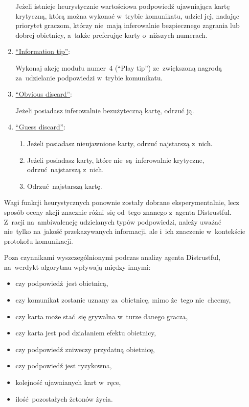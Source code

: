\documentclass[declaration,shortabstract,inz]{iithesis}
\begin{document}
\begin{enumerate}
	Jeżeli istnieje heurystycznie wartościowa podpowiedź ujawniająca kartę krytyczną, którą można wykonać w~trybie komunikatu, udziel jej, nadając priorytet graczom, którzy nie~mają inferowalnie bezpiecznego zagrania lub dobrej obietnicy, a~także preferując karty o~niższych numerach.
	
	\item \underline{``Information tip''}:
	
	Wykonaj akcję modułu numer~4 (``Play tip'') ze~zwiększoną nagrodą za~udzielanie podpowiedzi w~trybie komunikatu.
	
	\item \underline{``Obvious discard''}:
	
	Jeżeli posiadasz inferowalnie bezużyteczną kartę, odrzuć ją.

	\item \underline{``Guess discard''}:
	\begin{enumerate}
		\item Jeżeli posiadasz nieujawnione karty, odrzuć najstarszą z~nich.
		\item Jeżeli posiadasz karty, które nie~są~inferowalnie krytyczne, odrzuć najstarszą z~nich.
		\item Odrzuć najstarszą kartę.
	\end{enumerate}

\end{enumerate}

Wagi funkcji heurystycznych ponownie zostały dobrane eksperymentalnie, lecz sposób oceny akcji znacznie różni~się od~tego znanego z~agenta Distrustful. Z~racji na~ambiwalencję udzielanych typów podpowiedzi, należy uważać nie~tylko na~jakość przekazywanych informacji, ale i~ich znaczenie w~kontekście protokołu komunikacji.

Poza czynnikami wyszczególnionymi podczas analizy agenta Distrustful, na~werdykt algorytmu wpływają między innymi:

\begin{itemize}
	\item czy podpowiedź jest obietnicą,
	\item czy komunikat zostanie uznany za~obietnicę, mimo że~tego nie~chcemy,
	\item czy karta może stać~się grywalna w~turze danego gracza,
	\item czy karta jest pod działaniem efektu obietnicy,
	\item czy podpowiedź zniweczy przydatną obietnicę,
	\item czy podpowiedź jest ryzykowna,
	\item kolejność ujawnianych kart w~ręce,
	\item ilość pozostałych żetonów życia.
\end{itemize}
\end{document}
